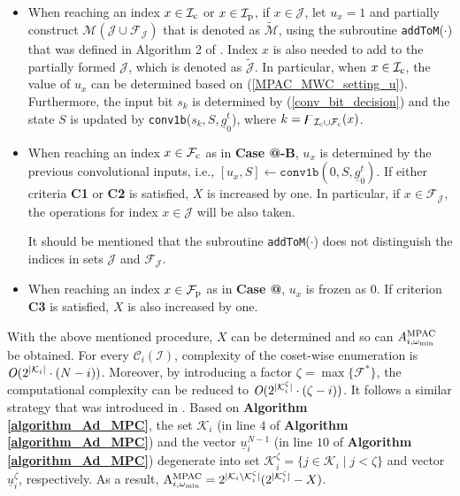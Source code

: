 \documentclass[12pt, draftclsnofoot, peerreview, onecolumn]{IEEEtran}
\makeatletter
\theoremstyle{noparent}
\newcommand{\Rmnum}[1]{\expandafter\@slowromancap\romannumeral #1@}
\makeatother
\begin{document}
\begin{itemize}
    \item When reaching an index $x\in \mathcal{I}_{\rm c}$ or $x\in \mathcal{I}_{\rm p}$,
    if $x\in\mathcal{J}$,
    let $u_x=1$ and partially construct $\mathcal{M}(\mathcal{J} \cup \mathcal{F}_\mathcal{J})$ that is
    denoted as $\tilde{\mathcal{M}}$, using the subroutine \texttt{addToM}($\cdot $)
    that was defined in Algorithm 2 of \cite{Rowshan2022FastEnumerationMinimum}.
    Index $x$ is also needed to add to the partially formed 
    $\mathcal{J}$, which is denoted as $\tilde{\mathcal{J}}$.
    In particular, when $x\in \mathcal{I}_{\rm c}$, the 
    value of $u_x$ can be determined based on (\ref{MPAC_MWC_setting_u}).
    Furthermore, the input bit $s_k$ is determined by (\ref{conv_bit_decision}) 
    and the state $S$ is updated by \texttt{conv1b}($s_k, S, \underline{g}_{0}^{t}$),
    where $k = \digamma_{\mathcal{I}_{\rm c}\cup\mathcal{F}_{\rm c}}(x)$.
    \item When reaching an index $x\in \mathcal{F}_{\rm c}$
    as in \textbf{Case \Rmnum{1}-B}, 
    $u_x$ is determined by the previous convolutional inputs,
    i.e., $[u_x, S] \leftarrow \texttt{conv1b}(0, S, \underline{g}_{0}^{t})$.
    If either criteria \textbf{C1} or \textbf{C2} is satisfied, 
    $X$ is increased by one.
    In particular, if $x\in\mathcal{F}_{\mathcal{J}}$,
    the operations for index $x\in \mathcal{J}$ will be also taken.
    
    It should be mentioned that the subroutine \texttt{addToM}($\cdot$) does not distinguish 
    the indices in sets $\mathcal{J}$ and $\mathcal{F}_{\mathcal{J}}$. 
    \item When reaching an index $x\in \mathcal{F}_{\rm p}$
    as in \textbf{Case \Rmnum{3}}, $u_x$ is frozen as $0$.
    If criterion \textbf{C3} is satisfied, 
    $X$ is also increased by one.
\end{itemize}

With the above mentioned procedure, $X$ can be determined and so can
$A_{i,\omega_{\rm{min}}}^{\rm{MPAC}}$ be obtained.
For every $\mathcal{C}_i(\mathcal{I})$, complexity of the coset-wise enumeration 
is ${\it O}(2^{|\mathcal{K}_i|}\cdot (N-i))$.
Moreover, by introducing a factor $\zeta=\max\{\mathcal{F}^{*}\}$, 
the computational complexity
can be reduced to ${\it O}(2^{|\mathcal{K}_i^{\zeta}|}\cdot (\zeta-i))$.
It follows a similar strategy that was introduced in \cite{Rowshan2022FastEnumerationMinimum}.
Based on {\bf Algorithm \ref{algorithm_Ad_MPC}},
the set $\mathcal{K}_i$ (in line $4$ of {\bf Algorithm \ref{algorithm_Ad_MPC}}) 
and the vector $\underline{u}_i^{N-1}$ (in line $10$ of {\bf Algorithm \ref{algorithm_Ad_MPC}})
degenerate into set $\mathcal{K}_i^{\zeta}=\{j\in\mathcal{K}_i  \mid  j< \zeta \}$ and 
vector $\underline{u}_i^{\zeta}$, respectively.
As a result, 
${\rm A}_{i,\omega_{\min}}^{\rm MPAC}=2^{|\mathcal{K}_i\setminus\mathcal{K}_i^{\zeta}|}
(2^{|\mathcal{K}_i^{\zeta}|}-X)$.
\end{document}
